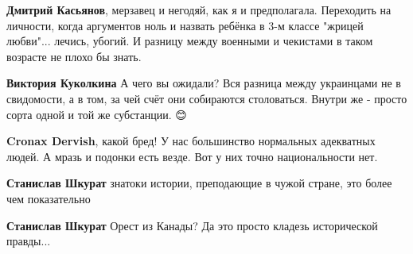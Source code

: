 \begin{itemize}
\begin{itemize}
 
\textbf{Дмитрий Касьянов}, мерзавец и негодяй, как я и предполагала. Переходить
на личности, когда аргументов ноль и назвать ребёнка в 3-м классе "жрицей
любви"... лечись, убогий. И разницу между военными и чекистами в таком возрасте
не плохо бы знать.

 
\textbf{Виктория Куколкина} А чего вы ожидали? Вся разница между украинцами не в свидомости, а в том, за чей счёт они собираются столоваться. Внутри же - просто сорта одной и той же субстанции. 😊

 
\textbf{Cronax Dervish}, какой бред! У нас большинство нормальных адекватных людей. А мразь и подонки есть везде. Вот у них точно национальности нет.

 
\textbf{Станислав Шкурат} знатоки истории, преподающие в чужой стране, это более чем показательно

 
\textbf{Станислав Шкурат} Орест из Канады? Да это просто кладезь исторической правды...

 

\end{itemize}
\end{itemize}
